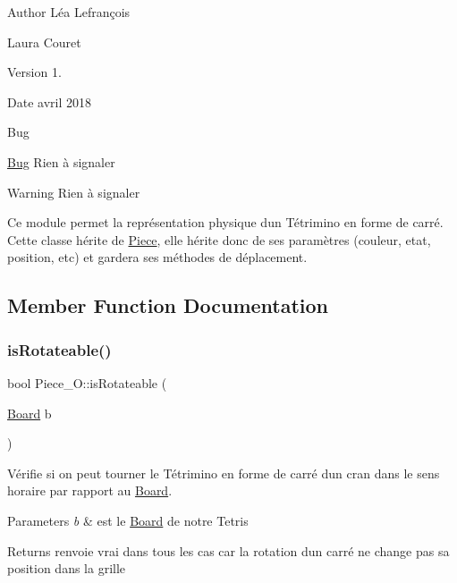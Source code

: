 \begin{DoxyAuthor}{Author}
Léa Lefrançois 

Laura Couret 
\end{DoxyAuthor}
\begin{DoxyVersion}{Version}
1. 
\end{DoxyVersion}
\begin{DoxyDate}{Date}
avril 2018 
\end{DoxyDate}
\begin{DoxyRefDesc}{Bug}
\item[\hyperlink{bug__bug000014}{Bug}]Rien à signaler \end{DoxyRefDesc}
\begin{DoxyWarning}{Warning}
Rien à signaler
\end{DoxyWarning}
Ce module permet la représentation physique d\textquotesingle{}un Tétrimino en forme de carré. Cette classe hérite de \hyperlink{classPiece}{Piece}, elle hérite donc de ses paramètres (couleur, etat, position, etc) et gardera ses méthodes de déplacement. 

\subsection{Member Function Documentation}
\mbox{\label{classPiece__O_af82900ecec4e7bd058d43825293d8bff}} 
\subsubsection{\texorpdfstring{is\+Rotateable()}{isRotateable()}}
{\footnotesize\ttfamily bool Piece\+\_\+\+O\+::is\+Rotateable (\begin{DoxyParamCaption}\item[{\hyperlink{classBoard}{Board}}]{b }\end{DoxyParamCaption})\hspace{0.3cm}{\ttfamily [virtual]}}



Vérifie si on peut tourner le Tétrimino en forme de carré d\textquotesingle{}un cran dans le sens horaire par rapport au \hyperlink{classBoard}{Board}. 


\begin{DoxyParams}{Parameters}
{\em b} & est le \hyperlink{classBoard}{Board} de notre Tetris \\
\hline
\end{DoxyParams}
\begin{DoxyReturn}{Returns}
renvoie vrai dans tous les cas car la rotation d\textquotesingle{}un carré ne change pas sa position dans la grille 
\end{DoxyReturn}


